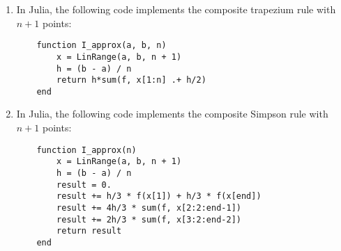 \documentclass[a4paper]{article}
\begin{document}
\begin{enumerate}
    \item
        In Julia, the following code implements the composite trapezium rule with $n+1$ points:
        \begin{verbatim}
    function I_approx(a, b, n)
        x = LinRange(a, b, n + 1)
        h = (b - a) / n
        return h*sum(f, x[1:n] .+ h/2)
    end
        \end{verbatim}

    \item
        In Julia, the following code implements the composite Simpson rule with $n+1$ points:
        \begin{verbatim}
    function I_approx(n)
        x = LinRange(a, b, n + 1)
        h = (b - a) / n
        result = 0.
        result += h/3 * f(x[1]) + h/3 * f(x[end])
        result += 4h/3 * sum(f, x[2:2:end-1])
        result += 2h/3 * sum(f, x[3:2:end-2])
        return result
    end
        \end{verbatim}
    \end{enumerate}
\end{document}
